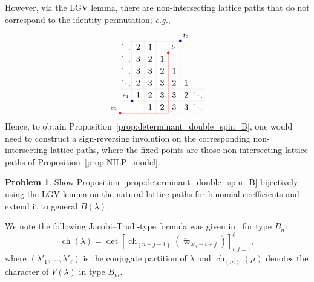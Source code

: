 \documentclass[11pt, leqno]{amsart}
\theoremstyle{plain}
\theoremstyle{definition}
\newtheorem{problem}[theorem]{Problem}
\numberwithin{equation}{section}
\newcommand{\xx}{\mathbf{x}}
\newcommand{\rr}{\textbf{\textit{r}}}
\newcommand{\fw}{\varpi} %
\newcommand{\tfw}{\widetilde{\fw}} %
\newcommand{\ch}{\operatorname{ch}} %
\newcommand{\SSRT}{\operatorname{SSRT}}
\def\lmm{{\lambda/\mu}}
\begin{document}
However, via the LGV lemma, there are non-intersecting lattice paths that do not correspond to the identity permutation; \textit{e.g.},
\[
\begin{tikzpicture}[scale=0.5,baseline=-40]
\begin{scope}
\board
\fill[blue] (0.5,-4.5) circle (0.1);
\fill[blue] (4.5,0.5) circle (0.1);
\draw[blue] (0.5,-4.5) -- (0.5,0.5) -- (4.5,0.5);
\fill[red] (-0.5,-5.5) circle (0.1);
\fill[red] (3.5,-0.5) circle (0.1);
\draw[red] (-0.5,-5.5) -- (3.5,-5.5) -- (3.5,-0.5);
\end{scope}
\node[anchor=south east] at (0.5,-4.5) {\scriptsize $s_1$};
\node[anchor=south east] at (-0.5,-5.5) {\scriptsize $s_2$};
\node[anchor=south west] at (3.5,-0.5) {\scriptsize $t_1$};
\node[anchor=south west] at (4.5,0.5) {\scriptsize $t_2$};
\end{tikzpicture}
\]
Hence, to obtain Proposition~\ref{prop:determinant_double_spin_B}, one would need to construct a sign-reversing involution on the corresponding non-intersecting lattice paths, where the fixed points are those non-intersecting lattice paths of Proposition~\ref{prop:NILP_model}.

\begin{problem}
Show Proposition~\ref{prop:determinant_double_spin_B} bijectively using the LGV lemma on the natural lattice paths for binomial coefficients and extend it to general $B(\lambda)$.
\end{problem}

We note the following Jacobi--Trudi-type formula was given in~\cite{Okada89} for type $B_n$:
\[
\ch(\lambda) = \det \left[ \ch_{(n+j-1)}(\tfw_{\lambda'_i - i + j}) \right]_{i,j=1}^{\ell},
\]
where $(\lambda'_1, \dotsc, \lambda'_{\ell})$ is the conjugate partition of $\lambda$ and $\ch_{(m)}(\mu)$ denotes the character of $V(\lambda)$ in type $B_m$.



\end{document}
